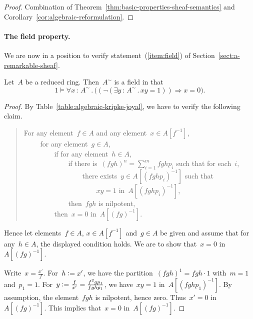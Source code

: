 \documentclass{ws-rv9x6}
\newcommand{\defeq}{\vcentcolon=}
\renewcommand{\_}{\mathpunct{.}}
\newcommand{\?}{\,{:}\,}
\begin{document}
\begin{proof}Combination of Theorem~\ref{thm:basic-properties-sheaf-semantics}
and Corollary~\ref{cor:algebraic-reformulation}.\end{proof}


\paragraph{The field property.} We are now in a position to verify
statement~(\ref{item:field}) of Section~\ref{sect:a-remarkable-sheaf}.

\begin{proposition}\label{prop:field-property}
Let~$A$ be a reduced ring. Then~$A^\sim$ is a field in that
\[ 1 \models \forall x\?A^\sim\_ \bigl((\neg(\exists y\?A^\sim\_ xy = 1)) \Rightarrow
x = 0\bigr). \]
\end{proposition}

\begin{proof}By Table~\ref{table:algebraic-kripke-joyal}, we have to verify the
following claim.
\begin{quote}
For any element~$f \in A$ and any element~$x \in A[f^{-1}]$, \\
${\qquad}$ for any element~$g \in A$, \\
${\qquad\qquad}$ if for any element~$h \in A$, \\
${\qquad\qquad\qquad}$ if there is~$(fgh)^n = \sum_{i=1}^m fghp_i$
such that for each~$i$, \\
${\qquad\qquad\qquad\qquad}$ there exists~$y \in
A[(fghp_i)^{-1}]$ such that \\
${\qquad\qquad\qquad\qquad\qquad}$ $xy = 1$ in~$A[(fghp_i)^{-1}]$, \\
${\qquad\qquad\qquad}$ then~$fgh$ is nilpotent, \\
${\qquad\qquad}$ then~$x = 0$ in~$A[(fg)^{-1}]$.
\end{quote}
Hence let elements~$f \in A$, $x \in A[f^{-1}]$ and~$g \in A$ be given and
assume that for any~$h \in A$, the displayed condition holds. We are to show
that~$x = 0$ in~$A[(fg)^{-1}]$.

Write~$x = \frac{x'}{f}$. For~$h \defeq x'$, we have the
partition~$(fgh)^1 = fgh \cdot 1$ with~$m = 1$ and~$p_1 = 1$. For~$y \defeq
\frac{f}{x'} = \frac{f^2gp_1}{fghp_1}$, we have~$xy = 1$ in~$A[(fghp_1)^{-1}]$.
By assumption, the element~$fgh$ is nilpotent, hence zero. Thus~$x' = 0$
in~$A[(fg)^{-1}]$. This implies that~$x = 0$ in~$A[(fg)^{-1}]$.
\end{proof}
\end{document}
